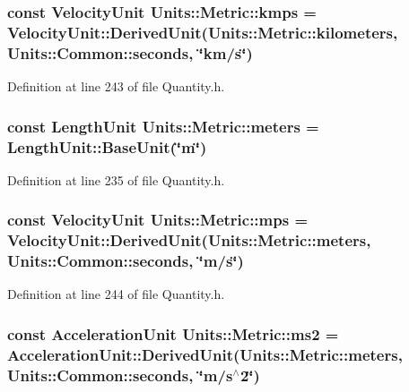 \hypertarget{class_units_1_1_metric_ae30e1438d1f93d6d08901e1fe9b31919}{
\subsubsection[{kmps}]{\setlength{\rightskip}{0pt plus 5cm}const {\bf Velocity\+Unit} Units\+::\+Metric\+::kmps = {\bf Velocity\+Unit\+::\+Derived\+Unit}({\bf Units\+::\+Metric\+::kilometers}, {\bf Units\+::\+Common\+::seconds}, \char`\"{}km/{\bf s}\char`\"{})\hspace{0.3cm}{\ttfamily [static]}}}\label{class_units_1_1_metric_ae30e1438d1f93d6d08901e1fe9b31919}


Definition at line 243 of file Quantity.\+h.

\hypertarget{class_units_1_1_metric_a74b4e02c4b56750866bb289784d964ba}{
\subsubsection[{meters}]{\setlength{\rightskip}{0pt plus 5cm}const {\bf Length\+Unit} Units\+::\+Metric\+::meters = {\bf Length\+Unit\+::\+Base\+Unit}(\char`\"{}m\char`\"{})\hspace{0.3cm}{\ttfamily [static]}}}\label{class_units_1_1_metric_a74b4e02c4b56750866bb289784d964ba}


Definition at line 235 of file Quantity.\+h.

\hypertarget{class_units_1_1_metric_af960d1782d357569275d856dc28ed895}{
\subsubsection[{mps}]{\setlength{\rightskip}{0pt plus 5cm}const {\bf Velocity\+Unit} Units\+::\+Metric\+::mps = {\bf Velocity\+Unit\+::\+Derived\+Unit}({\bf Units\+::\+Metric\+::meters}, {\bf Units\+::\+Common\+::seconds}, \char`\"{}m/{\bf s}\char`\"{})\hspace{0.3cm}{\ttfamily [static]}}}\label{class_units_1_1_metric_af960d1782d357569275d856dc28ed895}


Definition at line 244 of file Quantity.\+h.

\hypertarget{class_units_1_1_metric_a172a4a3ec21992ffee09794cf07f9563}{
\subsubsection[{ms2}]{\setlength{\rightskip}{0pt plus 5cm}const {\bf Acceleration\+Unit} Units\+::\+Metric\+::ms2 = {\bf Acceleration\+Unit\+::\+Derived\+Unit}({\bf Units\+::\+Metric\+::meters}, {\bf Units\+::\+Common\+::seconds}, \char`\"{}m/{\bf s}$^\wedge$2\char`\"{})\hspace{0.3cm}{\ttfamily [static]}}}\label{class_units_1_1_metric_a172a4a3ec21992ffee09794cf07f9563}


